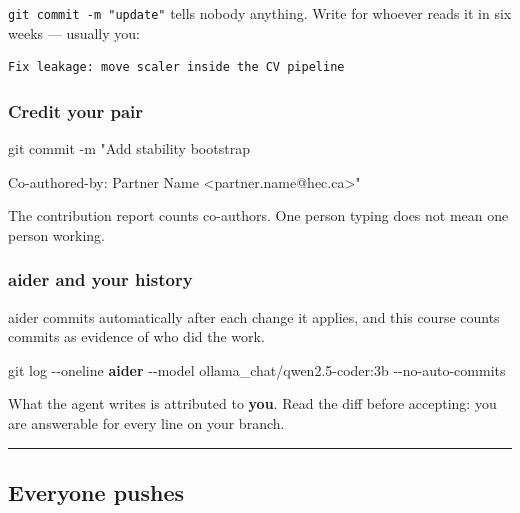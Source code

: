 \documentclass[
  letterpaper,
  10pt,
  twoside,
  openright,
  numbers=noenddot,
  chapterprefix=true]{scrbook}
\newenvironment{Shaded}{}{}
\newcommand{\AttributeTok}[1]{\textcolor[rgb]{0.84,0.23,0.29}{#1}}
\newcommand{\ExtensionTok}[1]{\textcolor[rgb]{0.84,0.23,0.29}{\textbf{#1}}}
\newcommand{\FunctionTok}[1]{\textcolor[rgb]{0.44,0.26,0.76}{#1}}
\newcommand{\NormalTok}[1]{\textcolor[rgb]{0.14,0.16,0.18}{#1}}
\newcommand{\StringTok}[1]{\textcolor[rgb]{0.01,0.18,0.38}{#1}}
\begin{document}
\texttt{git\ commit\ -m\ "update"} tells nobody anything. Write for
whoever reads it in six weeks --- usually you:

\begin{verbatim}
Fix leakage: move scaler inside the CV pipeline
\end{verbatim}

\subsubsection{Credit your pair}\label{credit-your-pair}

\begin{Shaded}
\begin{Highlighting}[]
\FunctionTok{git}\NormalTok{ commit }\AttributeTok{{-}m} \StringTok{"Add stability bootstrap}

\StringTok{Co{-}authored{-}by: Partner Name \textless{}partner.name@hec.ca\textgreater{}"}
\end{Highlighting}
\end{Shaded}

The contribution report counts co-authors. One person typing does not
mean one person working.

\subsubsection{aider and your history}\label{aider-and-your-history}

aider commits automatically after each change it applies, and this
course counts commits as evidence of who did the work.

\begin{Shaded}
\begin{Highlighting}[]
\FunctionTok{git}\NormalTok{ log }\AttributeTok{{-}{-}oneline}
\ExtensionTok{aider} \AttributeTok{{-}{-}model}\NormalTok{ ollama\_chat/qwen2.5{-}coder:3b }\AttributeTok{{-}{-}no{-}auto{-}commits}
\end{Highlighting}
\end{Shaded}

What the agent writes is attributed to \textbf{you}. Read the diff
before accepting: you are answerable for every line on your branch.

\begin{center}\rule{0.5\linewidth}{0.5pt}\end{center}

\subsection{Everyone pushes}\label{everyone-pushes}
\end{document}
